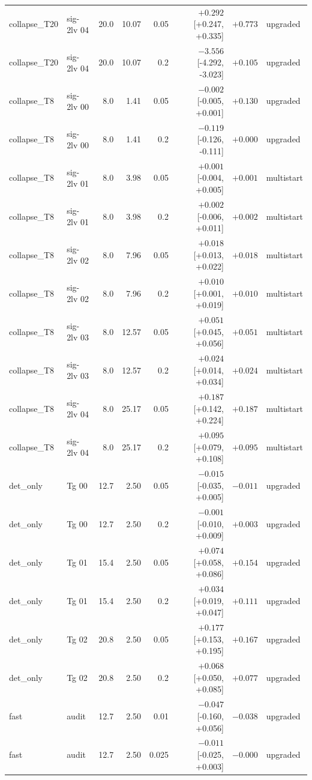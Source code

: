 \begin{longtable}{@{}llrrrrrl@{}}
collapse\_T20 & sig-2lv 04 & 20.0 & 10.07 & 0.05 & $+0.292$ [+0.247, +0.335] & $+0.773$ & upgraded\\
collapse\_T20 & sig-2lv 04 & 20.0 & 10.07 & 0.2 & $-3.556$ [-4.292, -3.023] & $+0.105$ & upgraded\\
collapse\_T8 & sig-2lv 00 & 8.0 & 1.41 & 0.05 & $-0.002$ [-0.005, +0.001] & $+0.130$ & upgraded\\
collapse\_T8 & sig-2lv 00 & 8.0 & 1.41 & 0.2 & $-0.119$ [-0.126, -0.111] & $+0.000$ & upgraded\\
collapse\_T8 & sig-2lv 01 & 8.0 & 3.98 & 0.05 & $+0.001$ [-0.004, +0.005] & $+0.001$ & multistart\\
collapse\_T8 & sig-2lv 01 & 8.0 & 3.98 & 0.2 & $+0.002$ [-0.006, +0.011] & $+0.002$ & multistart\\
collapse\_T8 & sig-2lv 02 & 8.0 & 7.96 & 0.05 & $+0.018$ [+0.013, +0.022] & $+0.018$ & multistart\\
collapse\_T8 & sig-2lv 02 & 8.0 & 7.96 & 0.2 & $+0.010$ [+0.001, +0.019] & $+0.010$ & multistart\\
collapse\_T8 & sig-2lv 03 & 8.0 & 12.57 & 0.05 & $+0.051$ [+0.045, +0.056] & $+0.051$ & multistart\\
collapse\_T8 & sig-2lv 03 & 8.0 & 12.57 & 0.2 & $+0.024$ [+0.014, +0.034] & $+0.024$ & multistart\\
collapse\_T8 & sig-2lv 04 & 8.0 & 25.17 & 0.05 & $+0.187$ [+0.142, +0.224] & $+0.187$ & multistart\\
collapse\_T8 & sig-2lv 04 & 8.0 & 25.17 & 0.2 & $+0.095$ [+0.079, +0.108] & $+0.095$ & multistart\\
det\_only & Tg 00 & 12.7 & 2.50 & 0.05 & $-0.015$ [-0.035, +0.005] & $-0.011$ & upgraded\\
det\_only & Tg 00 & 12.7 & 2.50 & 0.2 & $-0.001$ [-0.010, +0.009] & $+0.003$ & upgraded\\
det\_only & Tg 01 & 15.4 & 2.50 & 0.05 & $+0.074$ [+0.058, +0.086] & $+0.154$ & upgraded\\
det\_only & Tg 01 & 15.4 & 2.50 & 0.2 & $+0.034$ [+0.019, +0.047] & $+0.111$ & upgraded\\
det\_only & Tg 02 & 20.8 & 2.50 & 0.05 & $+0.177$ [+0.153, +0.195] & $+0.167$ & upgraded\\
det\_only & Tg 02 & 20.8 & 2.50 & 0.2 & $+0.068$ [+0.050, +0.085] & $+0.077$ & upgraded\\
fast & audit & 12.7 & 2.50 & 0.01 & $-0.047$ [-0.160, +0.056] & $-0.038$ & upgraded\\
fast & audit & 12.7 & 2.50 & 0.025 & $-0.011$ [-0.025, +0.003] & $-0.000$ & upgraded\\

\end{longtable}
